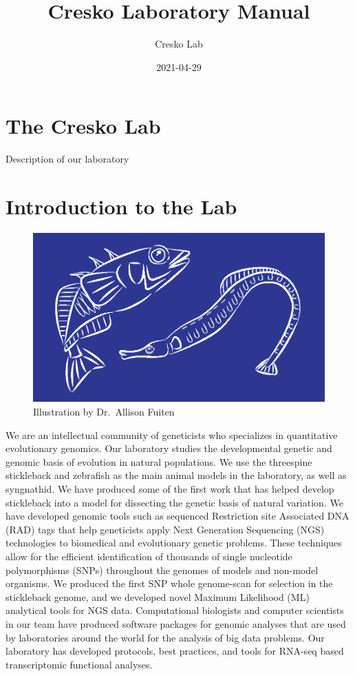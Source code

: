 \documentclass[
]{book}
\title{Cresko Laboratory Manual}
\author{Cresko Lab}
\date{2021-04-29}
\begin{document}
\maketitle

{
\setcounter{tocdepth}{1}
\tableofcontents
}
\hypertarget{the-cresko-lab}{%
\chapter{The Cresko Lab}\label{the-cresko-lab}}

Description of our laboratory

\hypertarget{introduction-to-the-lab}{%
\chapter{Introduction to the Lab}\label{introduction-to-the-lab}}

\begin{figure}
\centering
\includegraphics{images/Lab_logo.png}
\caption{Illustration by Dr.~Allison Fuiten}
\end{figure}

We are an intellectual community of geneticists who specializes in quantitative evolutionary genomics. Our laboratory studies the developmental genetic and genomic basis of evolution in natural populations. We use the threespine stickleback and zebrafish as the main animal models in the laboratory, as well as syngnathid. We have produced some of the first work that has helped develop stickleback into a model for dissecting the genetic basis of natural variation. We have developed genomic tools such as sequenced Restriction site Associated DNA (RAD) tags that help geneticists apply Next Generation Sequencing (NGS) technologies to biomedical and evolutionary genetic problems. These techniques allow for the efficient identification of thousands of single nucleotide polymorphisms (SNPs) throughout the genomes of models and non-model organisms. We produced the first SNP whole genome-scan for selection in the stickleback genome, and we developed novel Maximum Likelihood (ML) analytical tools for NGS data. Computational biologists and computer scientists in our team have produced software packages for genomic analyses that are used by laboratories around the world for the analysis of big data problems. Our laboratory has developed protocols, best practices, and tools for RNA-seq based transcriptomic functional analyses.
\end{document}
